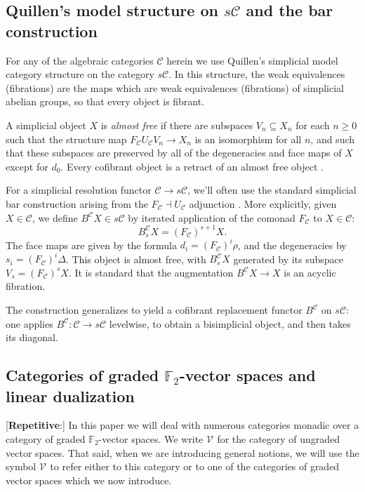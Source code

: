 \documentclass[11pt]{amsart}
\theoremstyle{plain}
\theoremstyle{definition}
\renewcommand{\to}{\longrightarrow}
\newcommand{\calC}{\mathcal{C}}
\newcommand{\calV}{\mathcal{V}}
\newcommand{\calc}{\mathcal{C}}
\theoremstyle{plain}
\newcommand{\vect}[2]{\calV^{#1}_{#2}}
\newcommand{\F}{\mathbb{F}}
\begin{document}
\begin{Conventions and notation}
\subsection{Quillen's model structure on $s\calC$ and the bar construction}\label{ssec: quillen model and bar construction}
For any of the algebraic categories $\calC$ herein we use Quillen's simplicial model category structure on the category $s\calC$. In this structure, the weak equivalences (fibrations) are the maps which are weak equivalences (fibrations) of simplicial abelian groups, so that every object is fibrant. 

 A simplicial object $X$ is \emph{almost free} if there are subspaces $V_n\subseteq X_n$ for each $n\geq0$ such that the structure map $F_{\calC}U_\calC V_n\to X_n$ is an isomorphism for all $n$, and such that these subspaces are preserved by all of the degeneracies and face maps of $X$ except for $d_0$. Every cofibrant object is a retract of an almost free object \cite[\S3]{MillerSullivanConjecture.pdf}.

For a simplicial resolution functor $\calC\to s\calC$, we'll often use the standard simplicial bar construction arising from the $F_\calC\dashv U_\calC$ adjunction \cite{BlumRiehlResolutions.pdf}. More explicitly, given $X\in\calC$, we define $B^\calC X\in s\calC$ by iterated application of the comonad $F_\calC$ to $X\in \calC$:
\[B_s^\calC X=(F_\calC)^{s+1}X.\]
The face maps are given by the formula $d_i=(F_\calC)^i\rho$, and the degeneracies by $s_i=(F_\calC)^i\Delta$. %
This object is almost free, with $B_s^\calC X$ generated by its subspace $V_s=(F_{\calC})^sX$. It is standard that the augmentation $B^\calC X\to X$ is an acyclic fibration.

The construction generalizes to yield a cofibrant replacement functor $B^{\calc}$ on $s\calc$: one applies  $B^{\calc}:\calc\to s\calc$ levelwise, to obtain a bisimplicial object, and then takes its diagonal.

\subsection{Categories of graded $\F_2$-vector spaces and linear dualization}
[\textbf{Repetitive}:] In this paper we will deal with numerous categories monadic over a category of graded $\F_2$-vector spaces.
We write $\vect{}{}$ for the category of ungraded vector spaces.
That said, when we are introducing general notions, we will use the symbol $\vect{}{}$ to refer either to this category or to one of the categories of graded vector spaces which we now introduce.   %


\end{Conventions and notation}
\end{document}
